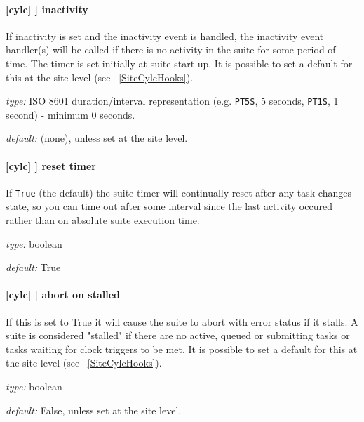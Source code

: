\paragraph[inactivity]{[cylc] \textrightarrow [[events]] \textrightarrow inactivity}

If inactivity is set and the inactivity event is handled, the inactivity event
handler(s) will be called if there is no activity in the suite for some period
of time. The timer is set initially at suite start up. It is possible to set a
default for this at the site level (see ~\ref{SiteCylcHooks}).

\begin{myitemize}
    \item {\em type:} ISO 8601 duration/interval representation (e.g.
 \lstinline=PT5S=, 5 seconds, \lstinline=PT1S=, 1 second) - minimum 0 seconds.
    \item {\em default:} (none), unless set at the site level.
\end{myitemize}

\paragraph[reset timer]{[cylc] \textrightarrow [[events]] \textrightarrow reset timer}

If \lstinline=True= (the default) the suite timer will continually reset
after any task changes state, so you can time out after some interval
since the last activity occured rather than on absolute suite execution
time.

\begin{myitemize}
    \item {\em type:} boolean
    \item {\em default:} True
\end{myitemize}

\paragraph[abort on stalled]{[cylc] \textrightarrow [[events]] \textrightarrow abort on stalled}

If this is set to True it will cause the suite to abort with error status
if it stalls. A suite is considered "stalled" if there are no active,
queued or submitting tasks or tasks waiting for clock triggers to be met. It is
possible to set a default for this at the site level
(see ~\ref{SiteCylcHooks}).

\begin{myitemize}
    \item {\em type:} boolean
    \item {\em default:} False, unless set at the site level.
\end{myitemize}

